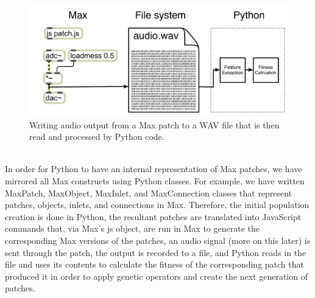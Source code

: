 \documentclass[a4paper,12pt]{report} 	%
\numberwithin{figure}{chapter}
\numberwithin{table}{chapter}
\numberwithin{equation}{chapter}
\begin{document}
\begin{flushleft}
\begin{figure}[h!]
\begin{center}
\includegraphics[scale=0.4]{MaxAudioToPython}
\caption[FromMax to Python]{Writing audio output from a Max patch to a WAV file that is then read and processed by Python code.}
\end{center}
\end{figure}
\\
In order for Python to have an internal representation of Max patches, we have mirrored all Max constructs using Python classes. For example, we have written MaxPatch, MaxObject, MaxInlet, and MaxConnection classes that represent patches, objects, inlets, and connections in Max. Therefore, the initial population creation is done in Python, the resultant patches are translated into JavaScript commands that, via Max's js object, are run in Max to generate the corresponding Max versions of the patches, an audio signal (more on this later) is sent through the patch, the output is recorded to a file, and Python reads in the file and uses its contents to calculate the fitness of the corresponding patch that produced it in order to apply genetic operators and create the next generation of patches.


\end{flushleft}
\end{document}
